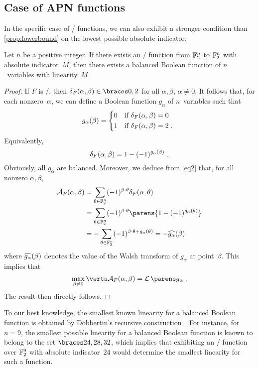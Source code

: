 \subsection{Case of APN functions}\label{sec:APN functions}
In the specific case of \APN/ functions, we can also exhibit a stronger condition than \cref{prop:lowerbound} on the lowest possible absolute indicator.
\begin{proposition}\label{prop:APN}
    Let $n$ be a positive integer.
    If there exists an \APN/ function from $\mathbb{F}_2^n$ to $\mathbb{F}_2^n$ with absolute indicator~$M$, then there exists a balanced Boolean function of $n$~variables with linearity~$M$.
\end{proposition}
\begin{proof}
    If $F$ is \APN/, then $\DC{F}(\alpha, \beta) \in \set{0,2}$ for all $\alpha, \beta$, $\alpha \neq 0$.
    It follows that, for each nonzero~$\alpha$, we can define a Boolean function $g_\alpha$ of $n$~variables such that
    \begin{equation*}
        g_\alpha(\beta) = \begin{cases*}
            0 & if $\DC{F}(\alpha, \beta)=0$ \\
            1 & if $\DC{F}(\alpha, \beta)=2$\;.
        \end{cases*}
    \end{equation*}
    Equivalently,
    \begin{equation*}
        \delta_{F}(\alpha, \beta) = 1 - (-1)^{g_\alpha(\beta)}\;.
    \end{equation*}
    Obviously, all $g_\alpha$ are balanced.
    Moreover, we deduce from \cref{eq2} that, for all nonzero $\alpha, \beta$,
    \begin{align*}
        \AC{F}(\alpha, \beta)
        &= \sum_{\theta \in \F_2^n} (-1)^{\iprod{\beta}{\theta}} \DC{F}(\alpha,\theta) \\
        &= \sum_{\theta \in \F_2^n} (-1)^{\iprod{\beta}{\theta}} \parens{1 - (-1)^{g_\alpha(\theta)}}\\
        &= -\sum_{\theta \in \F_2^n} (-1)^{\iprod{\beta}{\theta} + g_\alpha(\theta)} = -\FC{g_\alpha}(\beta)
    \end{align*}
    where $\widehat{g_\alpha}(\beta)$ denotes the value of the Walsh transform of $g_\alpha$ at point~$\beta$.
    This implies that
    \begin{equation*}
        \max_{\beta \neq 0} \abs{\AC{F}(\alpha, \beta)} = \linearity{g_\alpha}\;.
    \end{equation*}
    The result then directly follows.
\end{proof}
To our best knowledge, the smallest known linearity for a balanced Boolean function is obtained by Dobbertin's recursive construction~\cite{FSE:Dobbertin94}.
For instance, for $n=9$, the smallest possible linearity for a balanced Boolean function is known to belong to the set $\set{24, 28, 32}$, which implies that exhibiting an \APN/ function over $\mathbb{F}_2^9$ with absolute indicator~$24$ would determine the smallest linearity for such a function.

